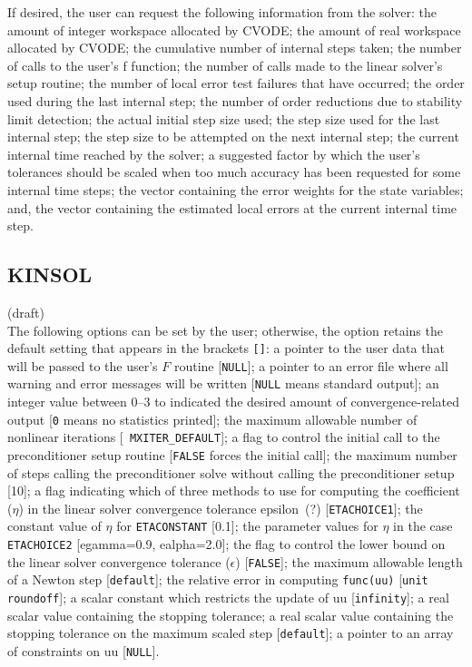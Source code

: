 If desired, the user can request the following information from the
solver: the amount of integer workspace allocated by CVODE; the amount
of real workspace allocated by CVODE; the cumulative number of
internal steps taken; the number of calls to the user's
f function; the number of calls made to the linear solver's setup
routine; the number of local error test failures that have occurred;
the order used during the last internal step; the number of order
reductions due to stability limit detection; the actual initial step
size used; the step size used for the last internal step; the step
size to be attempted on the next internal step; the current internal
time reached by the solver; a suggested factor by which the user's
tolerances should be scaled when too much accuracy has been requested
for some internal time steps; the vector containing the error weights
for the state variables; and, the vector containing the estimated
local errors at the current internal time step.

\subsection{KINSOL}

(draft) \\
The following options can be set by the user; otherwise, the option
retains the default setting that appears in the brackets {\tt []}:
a pointer to the user data that will be passed to the user's $F$
routine [{\tt NULL}]; a pointer to an error file where all
warning and error messages will be written [{\tt NULL} means standard
output]; an integer value between 0--3 to indicated the desired amount
of convergence-related output [{\tt 0} means no statistics printed];
the maximum allowable number of nonlinear iterations [{\tt
MXITER\_DEFAULT}]; a flag to control the initial call to the
preconditioner setup routine [{\tt FALSE} forces the initial call];
the maximum number of steps calling the preconditioner solve without
calling the preconditioner setup [10]; a flag indicating which of
three methods to use for computing the coefficient ($\eta$) in the linear
solver convergence tolerance epsilon~(?) [{\tt ETACHOICE1}]; the
constant value of $\eta$ for {\tt ETACONSTANT} [0.1]; the parameter
values for $\eta$ in the case {\tt ETACHOICE2} [egamma=0.9,
ealpha=2.0]; the flag to control the lower bound on the linear solver
convergence tolerance ($\epsilon$) [{\tt FALSE}]; the maximum
allowable length of a Newton step [{\tt default}]; the relative error
in computing {\tt func(uu)} [{\tt unit roundoff}]; a scalar constant
which restricts the update of uu [{\tt infinity}]; a real scalar value
containing the stopping tolerance; a real scalar value containing the
stopping tolerance on the maximum scaled step [{\tt default}]; a
pointer to an array of constraints on uu [{\tt NULL}].

